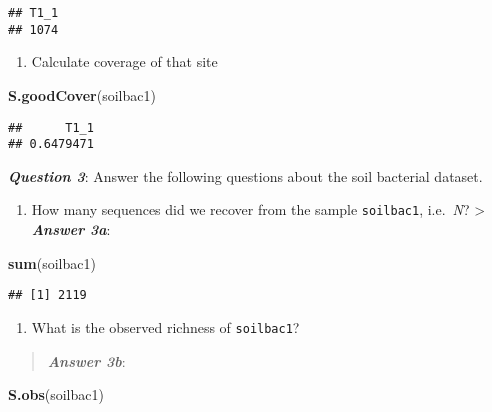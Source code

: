\documentclass[
]{article}
\newenvironment{Shaded}{\begin{snugshade}}{\end{snugshade}}
\newcommand{\KeywordTok}[1]{\textcolor[rgb]{0.13,0.29,0.53}{\textbf{#1}}}
\newcommand{\NormalTok}[1]{#1}
\providecommand{\tightlist}{%
  \setlength{\itemsep}{0pt}\setlength{\parskip}{0pt}}
\begin{document}
\begin{verbatim}
## T1_1 
## 1074
\end{verbatim}

\begin{enumerate}
\def\labelenumi{\arabic{enumi}.}
\setcounter{enumi}{4}
\tightlist
\item
  Calculate coverage of that site
\end{enumerate}

\begin{Shaded}
\begin{Highlighting}[]
\KeywordTok{S.goodCover}\NormalTok{(soilbac1)}
\end{Highlighting}
\end{Shaded}

\begin{verbatim}
##      T1_1 
## 0.6479471
\end{verbatim}

\textbf{\emph{Question 3}}: Answer the following questions about the
soil bacterial dataset.

\begin{enumerate}
\def\labelenumi{\alph{enumi}.}
\tightlist
\item
  How many sequences did we recover from the sample \texttt{soilbac1},
  i.e.~\emph{N}? \textgreater{} \textbf{\emph{Answer 3a}}:
\end{enumerate}

\begin{Shaded}
\begin{Highlighting}[]
\KeywordTok{sum}\NormalTok{(soilbac1)}
\end{Highlighting}
\end{Shaded}

\begin{verbatim}
## [1] 2119
\end{verbatim}

\begin{enumerate}
\def\labelenumi{\alph{enumi}.}
\setcounter{enumi}{1}
\tightlist
\item
  What is the observed richness of \texttt{soilbac1}?
\end{enumerate}

\begin{quote}
\textbf{\emph{Answer 3b}}:
\end{quote}

\begin{Shaded}
\begin{Highlighting}[]
\KeywordTok{S.obs}\NormalTok{(soilbac1)}
\end{Highlighting}
\end{Shaded}
\end{document}
